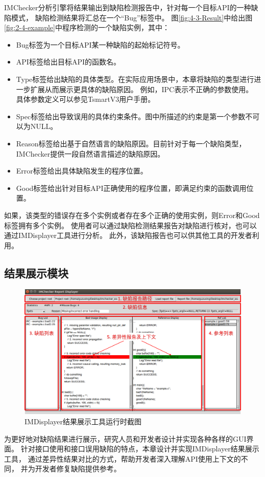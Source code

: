 IMChecker分析引擎将结果输出到缺陷检测报告中，针对每一个目标API的一种缺陷模式，
缺陷检测结果将汇总在一个“Bug”标签中。
图\ref{fig:4-3-Result}中给出图\ref{fig:2-4-example}中程序检测的一个缺陷实例，其中：
\begin{itemize}
	\item Bug标签为一个目标API某一种缺陷的起始标记符号。
	\item API标签给出目标API的函数名。
	\item Type标签给出缺陷的具体类型。在实际应用场景中，本章将缺陷的类型进行进一步扩展从而展示更具体的缺陷原因。
	例如，IPC表示不正确的参数使用。
	具体参数定义可以参见TsmartV3用户手册。
	\item Spec标签给出导致误用的具体约束条件。图中所描述的约束是第一个参数不可以为NULL。
	\item Reason标签给出基于自然语言的缺陷原因。目前针对于每一个缺陷类型，IMChecker提供一段自然语言描述的缺陷原因。
	\item Error标签给出具体缺陷发生的程序位置。
	\item Good标签给出针对目标API正确使用的程序位置，即满足约束的函数调用位置。
\end{itemize}
如果，该类型的错误存在多个实例或者存在多个正确的使用实例，则Error和Good标签拥有多个实例。
使用者可以通过缺陷检测结果报告对缺陷进行核对，也可以通过IMDisplayer工具进行分析。
此外，该缺陷报告也可以供其他工具的开发者利用。


\subsection{结果展示模块}
\begin{figure}[b]
	\centering
	\includegraphics[width=0.85\linewidth]{figures/cp4-IMDisplayer.png}
	\caption{
		IMDisplayer结果展示工具运行时截图
	}
	\label{fig:4-3-IMDisplayer}
\end{figure}

为更好地对缺陷结果进行展示，研究人员和开发者设计并实现各种各样的GUI界面。
针对接口使用和接口误用缺陷的特点，本章设计并实现IMDisplayer结果展示工具，
通过差异性结果对比的方式，帮助开发者深入理解API使用上下文的不同，
并为开发者修复缺陷提供参考。

